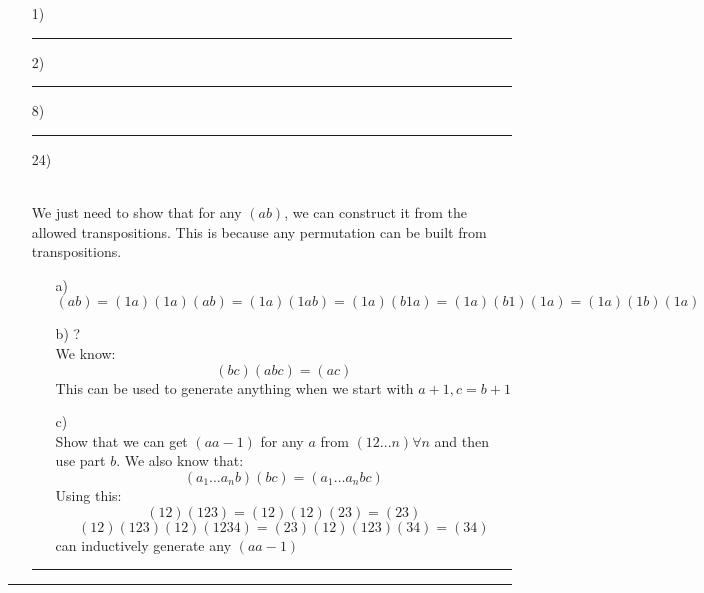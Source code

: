 \documentclass[11pt]{article}
\begin{document}
\begin{itemize}
    \item[1)] 
    \vspace{6pt}
    \hrule
    \vspace{6pt}
    \item[2)] 
    \vspace{6pt}
    \hrule
    \vspace{6pt}
    \item[8)]
    \vspace{6pt}
    \hrule
    \vspace{6pt}
    \item[24)]
    \begin{solution}\hfill \\
        We just need to show that for any $(ab)$, we can construct it from the allowed transpositions. This is because any permutation can be built from transpositions.
        \begin{itemize}
            \item[a)]
                $$(ab) = (1a)(1a)(ab) = (1a)(1ab) = (1a)(b1a) = (1a)(b1)(1a) = (1a)(1b)(1a)$$
            \item[b)] ? \\
            We know:  $$(bc)(abc) = (ac)$$
            This can be used to generate anything when we start with $a+1, c = b+1$
            \item[c)]\\
                Show that we can get $(a a-1)$ for any $a$ from $(12...n) \forall n$ and then use part $b$. We also know that:
                $$(a_1 \dots a_nb)(bc) = (a_1\dots a_nbc)$$
                Using this:
                $$(12)(123) = (12)(12)(23) = (23)$$
                $$(12)(123)(12)(1234) = (23)(12)(123)(34) = (34)$$
                can inductively generate any $(a a-1)$
        \end{itemize}
    \end{solution}
    \vspace{6pt}
    \hrule
    \vspace{6pt}
\end{itemize}
\vspace{6pt}
\hrule
\vspace{6pt}
\end{document}
